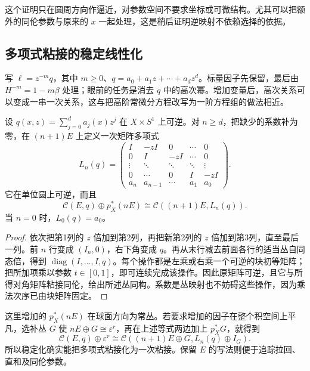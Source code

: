 这个证明只在圆周方向作逼近，对参数空间不要求坐标或可微结构。尤其可以把额外的同伦参数与原来的 \(x\) 一起处理，这是稍后证明逆映射不依赖选择的依据。

\subsection{多项式粘接的稳定线性化}
\label{g2:subsec:2403:04}
写 \(\ell=z^{-m}q\)，其中 \(m\ge0\)、\(q=a_0+a_1z+\cdots+a_dz^d\)。标量因子先保留，最后由 \(H^{-m}=1-m\beta\) 处理；眼前的任务是消去 \(q\) 中的高次幂。增加变量后，高次关系可以变成一串一次关系，这与把高阶常微分方程改写为一阶方程组的做法相近。

\begin{lemma}\label{g2:lem:k-polynomial-linearization}
	设 \(q(x,z)=\sum_{j=0}^d a_j(x)z^j\) 在 \(X\times S^1\) 上可逆。对 \(n\ge d\)，把缺少的系数补为零，在 \((n+1)E\) 上定义一次矩阵多项式
	\begin{equation}\label{g2:eq:k-linearization-matrix}
		L_n(q)=
		\begin{pmatrix}
			I&-zI&0&\cdots&0\\
			0&I&-zI&\cdots&0\\
			\vdots&\ddots&\ddots&\ddots&\vdots\\
			0&\cdots&0&I&-zI\\
			a_n&a_{n-1}&\cdots&a_1&a_0
		\end{pmatrix}.
	\end{equation}
	它在单位圆上可逆，而且
	\[
		\mathcal C(E,q)\oplus p_X^*(nE)\cong\mathcal C((n+1)E,L_n(q)).
	\]
	当 \(n=0\) 时，\(L_0(q)=a_0\)。
\end{lemma}
\begin{proof}
	依次把第1列的 \(z\) 倍加到第2列，再把新第2列的 \(z\) 倍加到第3列，直至最后一列。前 \(n\) 行变成 \((I_n,0)\)，右下角变成 \(q\)。再从末行减去前面各行的适当丛自同态倍，得到 \(\operatorname{diag}(I,\ldots,I,q)\)。每个操作都是左乘或右乘一个可逆的块初等矩阵；把所加项乘以参数 \(t\in[0,1]\)，即可连续完成该操作。因此原矩阵可逆，且它与所得对角矩阵粘接同伦，给出所述丛同构。系数是丛映射也不妨碍这些操作，因为乘法次序已由块矩阵固定。
\end{proof}

这里增加的 \(p_X^*(nE)\) 在球面方向为常丛。若要求增加的因子在整个积空间上平凡，选补丛 \(G\) 使 \(nE\oplus G\cong\varepsilon^r\)，再在上述等式两边加上 \(p_X^*G\)，就得到
\[
	\mathcal C(E,q)\oplus\varepsilon^r
	\cong\mathcal C((n+1)E\oplus G,L_n(q)\oplus I_G).
\]
所以稳定化确实能把多项式粘接化为一次粘接。保留 \(E\) 的写法则便于追踪拉回、直和及同伦参数。

